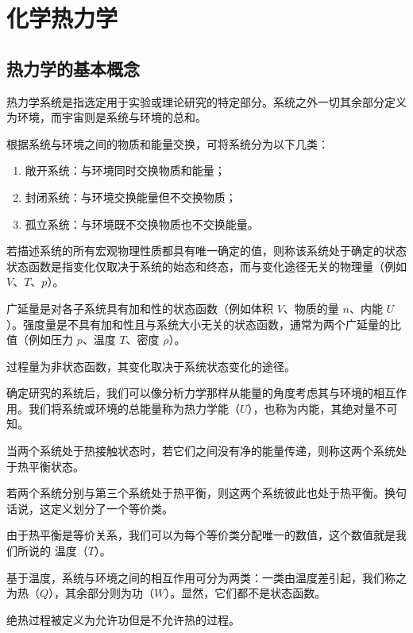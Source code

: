 \section{化学热力学}
\subsection{热力学的基本概念}
\begin{definition}[热力学系统]
热力学系统是指选定用于实验或理论研究的特定部分。系统之外一切其余部分定义为环境，而宇宙则是系统与环境的总和。
\end{definition}

根据系统与环境之间的物质和能量交换，可将系统分为以下几类：
\begin{enumerate}
    \item 敞开系统：与环境同时交换物质和能量；
    \item 封闭系统：与环境交换能量但不交换物质；
    \item 孤立系统：与环境既不交换物质也不交换能量。
\end{enumerate}

若描述系统的所有宏观物理性质都具有唯一确定的值，则称该系统处于确定的状态状态函数是指变化仅取决于系统的始态和终态，而与变化途径无关的物理量（例如 $V$、$T$、$p$）。

广延量是对各子系统具有加和性的状态函数（例如体积 $V$、物质的量 $n$、内能 $U$）。强度量是不具有加和性且与系统大小无关的状态函数，通常为两个广延量的比值（例如压力 $p$、温度 $T$、密度 $\rho$）。

过程量为非状态函数，其变化取决于系统状态变化的途径。

确定研究的系统后，我们可以像分析力学那样从能量的角度考虑其与环境的相互作用。我们将系统或环境的总能量称为热力学能（$U$），也称为内能，其绝对量不可知。

当两个系统处于热接触状态时，若它们之间没有净的能量传递，则称这两个系统处于热平衡状态。

\begin{proposition}[热力学第零定律]
若两个系统分别与第三个系统处于热平衡，则这两个系统彼此也处于热平衡。换句话说，这定义划分了一个等价类。
\end{proposition}
由于热平衡是等价关系，我们可以为每个等价类分配唯一的数值，这个数值就是我们所说的 温度（$T$）。

基于温度，系统与环境之间的相互作用可分为两类：一类由温度差引起，我们称之为热（$Q$），其余部分则为功（$W$）。显然，它们都不是状态函数。


绝热过程被定义为允许功但是不允许热的过程。

